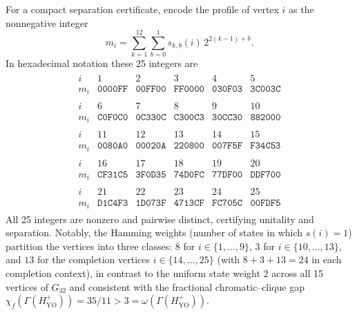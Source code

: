\documentclass[aps,pra,reprint,superscriptaddress,longbibliography,nofootinbib,floatfix,10pt]{revtex4-2}
\theoremstyle{definition}
\newcommand{\YO}{\mathrm{YO}}
\begin{document}
For a compact separation certificate, encode the profile of vertex $i$
as the nonnegative integer
\[
m_i=\sum_{k=1}^{12}\sum_{b=0}^1s_{k,b}(i)\,2^{2(k-1)+b}.
\]
In hexadecimal notation these 25 integers are
\begin{equation}\label{m:eq:yo-profiles}
\begin{gathered}
\begin{array}{c|rrrrr}
i&1&2&3&4&5\\\hline
m_i&\mathtt{0000FF}&\mathtt{00FF00}&\mathtt{FF0000}&\mathtt{030F03}&\mathtt{3C003C}
\end{array}\\[1ex]
\begin{array}{c|rrrrr}
i&6&7&8&9&10\\\hline
m_i&\mathtt{C0F0C0}&\mathtt{0C330C}&\mathtt{C300C3}&\mathtt{30CC30}&\mathtt{882000}
\end{array}\\[1ex]
\begin{array}{c|rrrrr}
i&11&12&13&14&15\\\hline
m_i&\mathtt{0080A0}&\mathtt{00020A}&\mathtt{220800}&\mathtt{007F5F}&\mathtt{F34C53}
\end{array}\\[1ex]
\begin{array}{c|rrrrr}
i&16&17&18&19&20\\\hline
m_i&\mathtt{CF31C5}&\mathtt{3F0D35}&\mathtt{74D0FC}&\mathtt{77DF00}&\mathtt{DDF700}
\end{array}\\[1ex]
\begin{array}{c|rrrrr}
i&21&22&23&24&25\\\hline
m_i&\mathtt{D1C4F3}&\mathtt{1D073F}&\mathtt{4713CF}&\mathtt{FC705C}&\mathtt{00FDF5}
\end{array}
\end{gathered}
\end{equation}
All 25 integers are nonzero and pairwise distinct, certifying unitality and
separation. Notably, the Hamming weights (number of states in which $s(i)=1$)
partition the vertices into three classes: $8$ for $i\in\{1,\ldots,9\}$, $3$
for $i\in\{10,\ldots,13\}$, and $13$ for the completion vertices
$i\in\{14,\ldots,25\}$ (with $8+3+13=24$ in each completion context), in
contrast to the uniform state weight $2$ across all 15 vertices of $G_{32}$ and
consistent with the fractional chromatic--clique gap
$\chi_f(\Gamma(H_{\YO}^{+}))=35/11>3=\omega(\Gamma(H_{\YO}^{+}))$.
\end{document}

